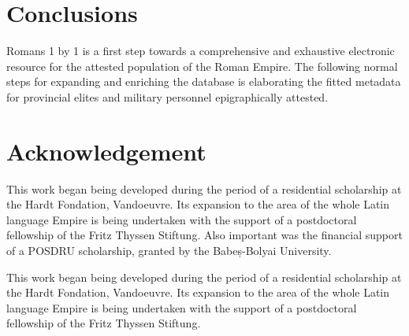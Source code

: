 \documentclass[amsthm,ebook]{saparticle}
\begin{document}
\section{Conclusions}

\noindent Romans 1 by 1 is a first step towards a comprehensive and exhaustive electronic resource for the attested population of
the Roman Empire. The following normal steps for expanding and enriching the database is elaborating the fitted
metadata for provincial elites and military personnel epigraphically attested.



\section*{Acknowledgement}
This work began being developed during the period of a residential scholarship at the Hardt Fondation, Vandoeuvre. Its
expansion to the area of the whole Latin language Empire is being undertaken with the support of a postdoctoral
fellowship of the Fritz Thyssen Stiftung. Also important was the financial support of a POSDRU scholarship, granted by
the Babeș-Bolyai University.

This work began being developed during the period of a residential scholarship at the Hardt Fondation, Vandoeuvre. Its
expansion to the area of the whole Latin language Empire is being undertaken with the support of a postdoctoral
fellowship of the Fritz Thyssen Stiftung. 



\end{document}
